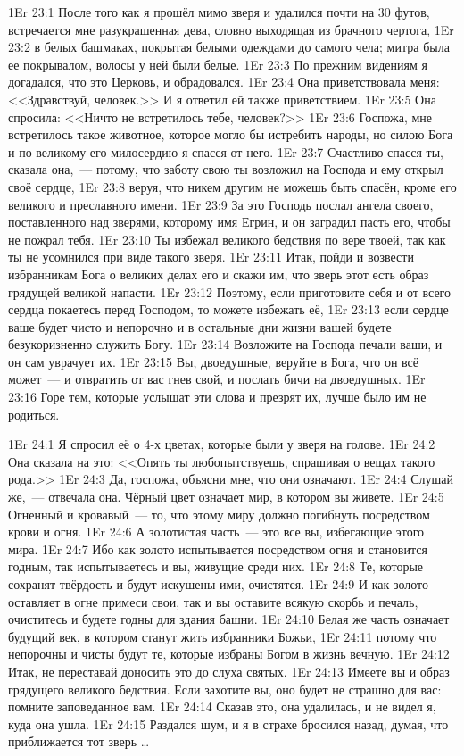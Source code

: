 \vs 1Er 23:1
После того как я прошёл мимо зверя и удалился почти на 30 футов,
встречается мне разукрашенная дева,
словно выходящая из брачного чертога,
\vs 1Er 23:2
в белых башмаках, покрытая белыми одеждами до самого чела;
митра была ее покрывалом, волосы у ней были белые.
\vs 1Er 23:3
По прежним видениям я догадался,
что это Церковь, и обрадовался.
\vs 1Er 23:4
Она приветствовала меня:
<<Здравствуй, человек.>>
И я ответил ей также приветствием.
\vs 1Er 23:5
Она спросила:
<<Ничто не встретилось тебе, человек?>>
\vs 1Er 23:6
Госпожа, мне встретилось такое животное,
которое могло бы истребить народы, но силою Бога
и по великому его милосердию я спасся от него.
\vs 1Er 23:7
Счастливо спасся ты, сказала она,~--- потому,
что заботу свою ты возложил на Господа и ему открыл своё сердце,
\vs 1Er 23:8
веруя, что никем другим не можешь быть спасён,
кроме его великого и преславного имени.
\vs 1Er 23:9
За это Господь послал ангела своего,
поставленного над зверями, которому имя Егрин,
и он заградил пасть его, чтобы не пожрал тебя.
\vs 1Er 23:10
Ты избежал великого бедствия по вере твоей,
так как ты не усомнился при виде такого зверя.
\vs 1Er 23:11
Итак, пойди и возвести избранникам Бога
о великих делах его и скажи им,
что зверь этот есть образ грядущей великой напасти.
\vs 1Er 23:12
Поэтому, если приготовите себя и от всего сердца
покаетесь перед Господом, то можете избежать её,
\vs 1Er 23:13
если сердце ваше будет чисто и непорочно
и в остальные дни жизни вашей
будете безукоризненно служить Богу.
\vs 1Er 23:14
Возложите на Господа печали ваши, и он сам уврачует их.
\vs 1Er 23:15
Вы, двоедушные, веруйте в Бога, что он всё может~--- и
отвратить от вас гнев свой, и послать бичи на двоедушных.
\vs 1Er 23:16
Горе тем, которые услышат эти слова и презрят их,
лучше было им не родиться.

\vs 1Er 24:1
Я спросил её о 4-х цветах, которые были у зверя на голове.
\vs 1Er 24:2
Она сказала на это:
<<Опять ты любопытствуешь, спрашивая о вещах такого рода.>>
\vs 1Er 24:3
Да, госпожа, объясни мне, что они означают.
\vs 1Er 24:4
Слушай же,~--- отвечала она.
Чёрный цвет означает мир, в котором вы живете.
\vs 1Er 24:5
Огненный и кровавый~--- то,
что этому миру должно погибнуть посредством крови и огня.
\vs 1Er 24:6
А золотистая часть~--- это все вы, избегающие этого мира.
\vs 1Er 24:7
Ибо как золото испытывается посредством огня
и становится годным, так испытываетесь и вы,
живущие среди них.
\vs 1Er 24:8
Те, которые сохранят твёрдость и будут искушены ими, очистятся.
\vs 1Er 24:9
И как золото оставляет в огне примеси свои,
так и вы оставите всякую скорбь и печаль, очиститесь и
будете годны для здания башни.
\vs 1Er 24:10
Белая же часть означает будущий век,
в котором станут жить избранники Божьи,
\vs 1Er 24:11
потому что непорочны и чисты будут те,
которые избраны Богом в жизнь вечную.
\vs 1Er 24:12
Итак, не переставай доносить это до слуха святых.
\vs 1Er 24:13
Имеете вы и образ грядущего великого бедствия.
Если захотите вы, оно будет не страшно для вас:
помните заповеданное вам.
\vs 1Er 24:14
Сказав это, она удалилась, и не видел я, куда она ушла.
\vs 1Er 24:15
Раздался шум, и я в страхе бросился назад,
думая, что приближается тот зверь \ldots
